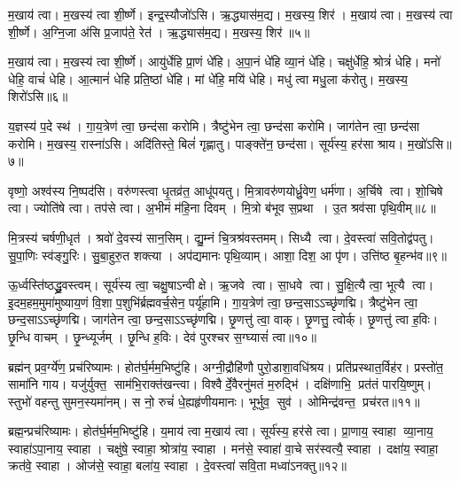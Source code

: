 म॒खाय॑ त्वा। म॒खस्य॑ त्वा शी॒र्ष्णे। इन्द्र॒स्यौजो॑ऽसि। ऋ॒द्ध्यास॑म॒द्य। म॒खस्य॒ शिर॑। म॒खाय॑ त्वा। म॒खस्य॑ त्वा शी॒र्ष्णे। अ॒ग्नि॒जा अ॑सि प्र॒जाप॑ते॒ रेत॑। ऋ॒द्ध्यास॑म॒द्य। म॒खस्य॒ शिर॑॥५॥

म॒खाय॑ त्वा। म॒खस्य॑ त्वा शी॒र्ष्णे। आयु॑र्धेहि प्रा॒णं धे॑हि। अ॒पा॒नं धे॑हि व्या॒नं धे॑हि। चक्षु॑र्धेहि॒ श्रोत्रं॑ धेहि। मनो॑ धेहि॒ वाचं॑ धेहि। आ॒त्मानं॑ धेहि प्रति॒ष्ठां धे॑हि। मां धे॑हि॒ मयि॑ धेहि। मधु॑ त्वा मधु॒ला क॑रोतु। म॒खस्य॒ शिरो॑ऽसि॥६॥

य॒ज्ञस्य॑ प॒दे स्थ॑। गा॒य॒त्रेण॑ त्वा॒ छन्द॑सा करोमि। त्रैष्टु॑भेन त्वा॒ छन्द॑सा करोमि। जाग॑तेन त्वा॒ छन्द॑सा करोमि। म॒खस्य॒ रास्ना॑ऽसि। अदि॑तिस्ते॒ बिलं॑ गृह्णातु। पाङ्क्ते॑न॒ छन्द॑सा। सूर्य॑स्य॒ हर॑सा श्राय। म॒खो॑ऽसि॥७॥
\anuvakamend[प॒ते॒ शिर॑ ऋतावरीर्\mbox{}ऋ॒द्ध्यास॑म॒द्य म॒खस्य॒ शिर॒ शिर॒ शिरो॑ऽसि॒ नव॑ च%
]

वृष्णो॒ अश्व॑स्य नि॒ष्पद॑सि। वरु॑णस्त्वा धृ॒तव्र॑त॒ आधू॑पयतु। मि॒त्रावरु॑णयोर्ध्रु॒वेण॒ धर्म॑णा। अ॒र्चिषे त्वा। शो॒चिषे त्वा। ज्योति॑षे त्वा। तप॑से त्वा। अ॒भीमं म॑हि॒ना दिवम्। मि॒त्रो ब॑भूव स॒प्रथा। उ॒त श्रव॑सा पृथि॒वीम्॥८॥

मि॒त्रस्य॑ चर्\mbox{}षणी॒धृत॑। श्रवो॑ दे॒वस्य॑ सान॒सिम्। द्यु॒म्नं चि॒त्रश्र॑वस्तमम्। सिध्यै त्वा। दे॒वस्त्वा॑ सवि॒तोद्व॑पतु। सु॒पा॒णिः स्व॑ङ्गु॒रिः। सु॒बा॒हुरु॒त शक्त्या। अप॑द्यमानः पृथि॒व्याम्। आशा॒ दिश॒ आ पृ॑ण। उत्ति॑ष्ठ बृ॒हन्भ॑व॥९॥

ऊ॒र्ध्वस्ति॑ष्ठद्ध्रु॒वस्त्वम्। सूर्य॑स्य त्वा॒ चक्षु॒षाऽन्वीक्षे। ऋ॒जवे त्वा। सा॒धवे त्वा। सु॒क्षि॒त्यै त्वा॒ भूत्यै त्वा। इ॒दम॒हम॒मुमा॑मुष्याय॒णं  वि॒शा प॒शुभि॑र्ब्रह्मवर्च॒सेन॒ पर्यू॑हामि। गा॒य॒त्रेण॑ त्वा॒ छन्द॒साऽऽच्छृ॑णद्मि। त्रैष्टु॑भेन त्वा॒ छन्द॒साऽऽच्छृ॑णद्मि। जाग॑तेन त्वा॒ छन्द॒साऽऽच्छृ॑णद्मि। छृ॒णत्तु॑ त्वा॒ वाक्। छृ॒णत्तु॒ त्वोर्क्। छृ॒णत्तु॑ त्वा ह॒विः। छृ॒न्धि वाचम्। छृ॒न्ध्यूर्जम्। छृ॒न्धि ह॒विः। देव॑ पुरश्चर स॒ग्घ्यासं॑ त्वा॥१०॥
\anuvakamend[पृ॒थि॒वीं भ॑व॒ वाख्षट्च॑]

ब्रह्म॑न् प्रव॒र्ग्ये॑ण॒ प्रच॑रिष्यामः। होत॑र्घ॒र्मम॒भिष्टु॑हि। अग्नी॒द्रौहि॑णौ पुरो॒डाशा॒वधि॑श्रय। प्रति॑प्रस्थात॒र्विह॑र। प्रस्तो॑त॒ सामा॑नि गाय। यजु॑र्\mbox{}युक्त॒ साम॑भि॒राक्त॑खन्त्वा। विश्वैर्दे॒वैरनु॑मतं म॒रुद्भि॑। दक्षि॑णाभि॒ प्रत॑तं पारयि॒ष्णुम्। स्तुभो॑ वहन्तु सुमन॒स्यमा॑नम्। स नो॒ रुचं॑ धे॒ह्यहृ॑णीयमानः। भूर्भुव॒ सुव॑। ओमिन्द्र॑वन्त॒ प्रच॑रत॥११॥
\anuvakamend[अहृ॑णीयमानो॒ द्वे च॑]

ब्रह्म॒न्प्रच॑रिष्यामः। होत॑र्घ॒र्मम॒भिष्टु॑हि। य॒माय॑ त्वा म॒खाय॑ त्वा। सूर्य॑स्य॒ हर॑से त्वा। प्रा॒णाय॒ स्वाहा व्या॒नाय॒ स्वाहा॑ऽपा॒नाय॒ स्वाहा। चक्षु॑षे॒ स्वाहा॒ श्रोत्रा॑य॒ स्वाहा। मन॑से॒ स्वाहा॑ वा॒चे सर॑स्वत्यै॒ स्वाहा। दक्षा॑य॒ स्वाहा॒ क्रत॑वे॒ स्वाहा। ओज॑से॒ स्वाहा॒ बला॑य॒ स्वाहा। दे॒वस्त्वा॑ सवि॒ता मध्वा॑ऽनक्तु॥१२॥

